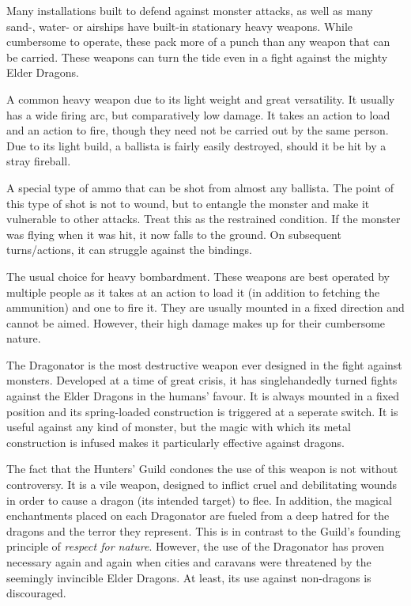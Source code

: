 Many installations built to defend against monster attacks, as well as many sand-, water- or airships have built-in stationary heavy weapons. While cumbersome to operate, these pack more of a punch than any weapon that can be carried. These weapons can turn the tide even in a fight against the mighty Elder Dragons.

A common heavy weapon due to its light weight and great versatility. It usually has a wide firing arc, but comparatively low damage. It takes an action to load and an action to fire, though they need not be carried out by the same person. Due to its light build, a ballista is fairly easily destroyed, should it be hit by a stray fireball.

A special type of ammo that can be shot from almost any ballista. The point of this type of shot is not to wound, but to entangle the monster and make it vulnerable to other attacks. Treat this as the restrained condition. If the monster was flying when it was hit, it now falls to the ground. On subsequent turns/actions, it can struggle against the bindings.

The usual choice for heavy bombardment. These weapons are best operated by multiple people as it takes at an action to load it (in addition to fetching the ammunition) and one to fire it. They are usually mounted in a fixed direction and cannot be aimed. However, their high damage makes up for their cumbersome nature.

The Dragonator is the most destructive weapon ever designed in the fight against monsters. Developed at a time of great crisis, it has singlehandedly turned fights against the Elder Dragons in the humans' favour. It is always mounted in a fixed position and its spring-loaded construction is triggered at a seperate switch. It is useful against any kind of monster, but the magic with which its metal construction is infused makes it particularly effective against dragons.

The fact that the Hunters' Guild condones the use of this weapon is not without controversy. It is a vile weapon, designed to inflict cruel and debilitating wounds in order to cause a dragon (its intended target) to flee. In addition, the magical enchantments placed on each Dragonator are fueled from a deep hatred for the dragons and the terror they represent. This is in contrast to the Guild's founding principle of \emph{respect for nature}. However, the use of the Dragonator has proven necessary again and again when cities and caravans were threatened by the seemingly invincible Elder Dragons. At least, its use against non-dragons is discouraged.


